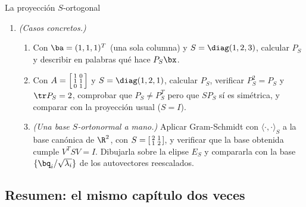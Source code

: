 \begin{entrega}{La proyección $S$-ortogonal}
\begin{enumerate}[label=\textbf{(\alph*)},itemsep=3pt,topsep=4pt]
\item \emph{(Casos concretos.)}
\begin{enumerate}[label=\textup{(\roman*)},itemsep=2pt,topsep=3pt]
\item Con $\ba=(1,1,1)^T$ (una sola columna) y $S=\diag(1,2,3)$, calcular
$P_S$ y describir en palabras qué hace $P_S\bx$.
\item Con
$A=\begin{bsmallmatrix}1&0\\ 1&1\\ 0&1\end{bsmallmatrix}$ y
$S=\diag(1,2,1)$, calcular $P_S$, verificar $P_S^2=P_S$ y $\tr P_S=2$,
comprobar que $P_S\neq P_S^T$ pero que $SP_S$ sí es simétrica, y comparar con
la proyección usual ($S=I$).
\item \emph{(Una base $S$-ortonormal a mano.)} Aplicar Gram-Schmidt con
$\langle\cdot,\cdot\rangle_S$ a la base canónica de $\R^2$, con
$S=\begin{bsmallmatrix}2&1\\ 1&2\end{bsmallmatrix}$, y verificar que la base
obtenida cumple $V^TSV=I$. Dibujarla sobre la elipse $E_S$ y compararla con
la base $\{\bq_i/\sqrt{\lambda_i}\}$ de los autovectores reescalados.
\end{enumerate}
\end{enumerate}

\medskip
{}
\end{entrega}

\subsection{Resumen: el mismo capítulo dos veces}

